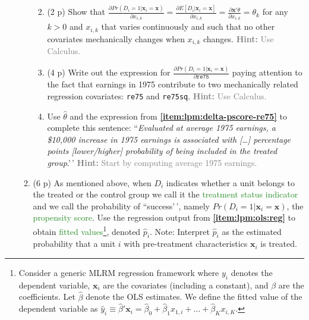 \documentclass[
]{article}
\begin{document}
\begin{enumerate}
\begin{enumerate}
    \begin{enumerate}
    \def\labelenumiii{\roman{enumiii}.}
    \item
      (2 p) Show that
      \(\frac{\partial Pr(D_i=1|\mathbf{x}_{i}=\mathbf{x})}{\partial x_{i,k}} = \frac{\partial E[D_i|\mathbf{x}_{i}=\mathbf{x}]}{\partial x_{i,k}}= \frac{\partial \mathbf{x}'\theta}{\partial x_{i,k}} = \theta_k\)
      for any \(k >0\) and \(x_{i,k}\) that varies continuously and such
      that no other covariates mechanically changes when \(x_{i,k}\)
      changes. \textcolor{gray}{\textbf{Hint:} Use Calculus.}
    \item
      (4 p) Write out the expression for
      \(\frac{\partial Pr(D_i=1|\mathbf{x}_{i}=\mathbf{x})}{\partial \texttt{re75}}\)
      paying attention to the fact that earnings in 1975 contribute to
      two mechanically related regression covariates: \texttt{re75} and
      \texttt{re75sq}.
      \textcolor{gray}{\textbf{Hint:} Use Calculus.}\label{item:lpm:delta-pscore-re75}
    \item
      Use \(\hat{\theta}\) and the expression from
      \textbf{\ref{item:lpm:delta-pscore-re75}} to complete this
      sentence:
      ``\textit{Evaluated at average 1975 earnings, a \$10,000 increase in 1975 earnings is associated with [\dots] percentage points [lower/higher] probability of being included in the treated group}.'\,'
      \textcolor{gray}{\textbf{Hint:} Start by computing average 1975 earnings.}
    \end{enumerate}
  \item
    (6 p) As mentioned above, when \(D_i\) indicates whether a unit
    belongs to the treated or the control group we call it the
    \textcolor{ForestGreen}{treatment status indicator} and we call the
    probability of ``success'\,', namely
    \(Pr(D_i=1|\mathbf{x}_i=\mathbf{x})\), the
    \textcolor{ForestGreen}{propensity score}. Use the regression output
    from \textbf{\ref{item:lpm:ols:reg}} to obtain
    \textcolor{ForestGreen}{fitted values}\footnote{Consider a generic MLRM regression framework where $y_i$ denotes the dependent variable, $\mathbf{x}_i$ are the covariates (including a constant), and $\beta$ are the coefficients. Let $\hat{\beta}$ denote the OLS estimates. We define the fitted value of the dependent variable as $\hat{y}_i \equiv \hat{\beta}'\mathbf{x}_i = \hat{\beta}_0 + \hat{\beta}_1 x_{1,i}+\ldots+\hat{\beta}_K x_{i,K}$.},
    denoted \(\hat{p}_i\). Note: Interpret \(\hat{p}_i\) as the
    estimated probability that a unit \(i\) with pre-treatment
    characteristics \(\mathbf{x}_i\) is treated.

\end{enumerate}
\end{enumerate}
\end{document}
